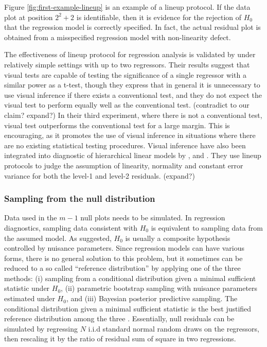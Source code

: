 \documentclass[]{interact}
\theoremstyle{plain}%
\theoremstyle{definition}
\theoremstyle{remark}
\begin{document}
Figure \ref{fig:first-example-lineup} is an example of a lineup
protocol. If the data plot at position \(2^2 + 2\) is identifiable, then
it is evidence for the rejection of \(H_0\) that the regression model is
correctly specified. In fact, the actual residual plot is obtained from
a misspecified regression model with non-linearity defect.

The effectiveness of lineup protocol for regression analysis is
validated by \citet{majumder_validation_2013} under relatively simple
settings with up to two regressors. Their results suggest that visual
tests are capable of testing the significance of a single regressor with
a similar power as a t-test, though they express that in general it is
unnecessary to use visual inference if there exists a conventional test,
and they do not expect the visual test to perform equally well as the
conventional test. (contradict to our claim? expand?) In their third
experiment, where there is not a conventional test, visual test
outperforms the conventional test for a large margin. This is
encouraging, as it promotes the use of visual inference in situations
where there are no existing statistical testing procedures. Visual
inference have also been integrated into diagnostic of hierarchical
linear models by \citet{loy2013diagnostic}, \citet{loy2014hlmdiag} and
\citet{loy2015you}. They use lineup protocols to judge the assumption of
linearity, normality and constant error variance for both the level-1
and level-2 residuals. (expand?)

\hypertarget{sampling-from-the-null-distribution}{%
\subsubsection{Sampling from the null
distribution}\label{sampling-from-the-null-distribution}}

Data used in the \(m - 1\) null plots needs to be simulated. In
regression diagnostics, sampling data consistent with \(H_0\) is
equivalent to sampling data from the assumed model. As
\citet{buja_statistical_2009} suggested, \(H_0\) is usually a composite
hypothesis controlled by nuisance parameters. Since regression models
can have various forms, there is no general solution to this problem,
but it sometimes can be reduced to a so called ``reference
distribution'' by applying one of the three methods: (i) sampling from a
conditional distribution given a minimal sufficient statistic under
\(H_0\), (ii) parametric bootstrap sampling with nuisance parameters
estimated under \(H_0\), and (iii) Bayesian posterior predictive
sampling. The conditional distribution given a minimal sufficient
statistic is the best justified reference distribution among the three
\citep{buja_statistical_2009}. Essentially, null residuals can be
simulated by regressing \(N\) i.i.d standard normal random draws on the
regressors, then rescaling it by the ratio of residual sum of square in
two regressions.
\end{document}
